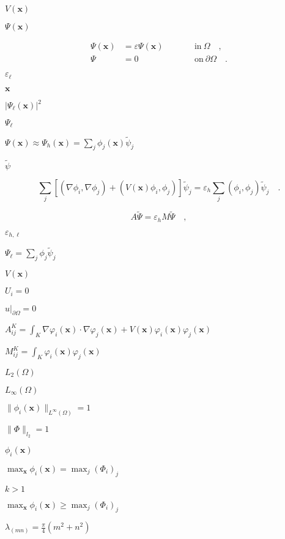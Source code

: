 \documentclass{article}
\begin{document}
$V(\mathbf x)$
\pagebreak

$\Psi(\mathbf x)$
\pagebreak

\begin{align*} [-\Delta + V(\mathbf x)] \Psi(\mathbf x) &= \varepsilon \Psi(\mathbf x) \qquad &&\text{in}\ \Omega\quad, \\ \Psi &= 0 &&\text{on}\ \partial\Omega\quad. \end{align*}
\pagebreak

$\varepsilon_\ell$
\pagebreak

$\mathbf x$
\pagebreak

$|\Psi_\ell(\mathbf x)|^2$
\pagebreak

$\Psi_\ell$
\pagebreak

$\Psi(\mathbf x)\approx\Psi_h(\mathbf x)=\sum_{j}\phi_j(\mathbf x)\tilde\psi_j$
\pagebreak

$\tilde\psi$
\pagebreak

\[ \sum_j [(\nabla\phi_i, \nabla\phi_j)+(V(\mathbf x)\phi_i,\phi_j)] \tilde{\psi}_j = \varepsilon_h \sum_j (\phi_i, \phi_j) \tilde{\psi}_j\quad. \]
\pagebreak

\[ A \tilde{\Psi} = \varepsilon_h M \tilde{\Psi} \quad, \]
\pagebreak

$\varepsilon_{h,\ell}$
\pagebreak

$\Psi_\ell=\sum_j \phi_j\tilde{\psi}_j$
\pagebreak

$V({\mathbf x})$
\pagebreak

$U_i=0$
\pagebreak

$u|_{\partial\Omega}=0$
\pagebreak

$A^K_{ij} = \int_K \nabla\varphi_i(\mathbf x) \cdot \nabla\varphi_j(\mathbf x) + V(\mathbf x)\varphi_i(\mathbf x)\varphi_j(\mathbf x)$
\pagebreak

$M^K_{ij} = \int_K \varphi_i(\mathbf x)\varphi_j(\mathbf x)$
\pagebreak

$L_2(\Omega)$
\pagebreak

$L_\infty(\Omega)$
\pagebreak

$\|\phi_i(\mathbf x)\|_{L^\infty(\Omega)}=1$
\pagebreak

$\|\Phi\|_{l_2}=1$
\pagebreak

$\phi_i(\mathbf x)$
\pagebreak

$\max_{\mathbf x}\phi_i(\mathbf x)=\max_j (\Phi_i)_j$
\pagebreak

$k>1$
\pagebreak

$\max_{\mathbf x}\phi_i(\mathbf x)\ge\max_j (\Phi_i)_j$
\pagebreak

$\lambda_{(mn)}=\frac{\pi}{4}(m^2+n^2)$
\pagebreak
\end{document}
